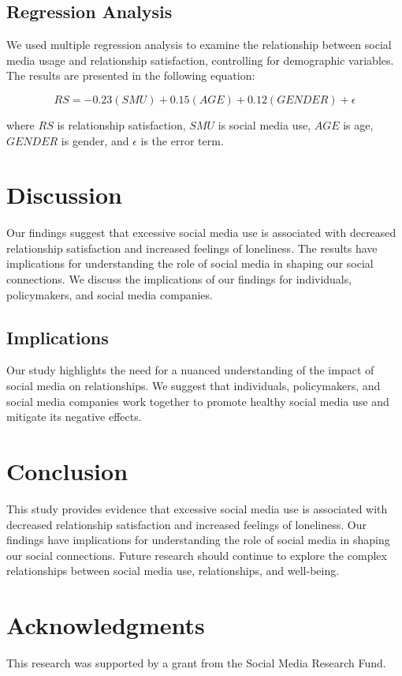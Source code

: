 \documentclass[12pt,a4paper]{article}
\begin{document}
\subsection{Regression Analysis}
We used multiple regression analysis to examine the relationship between social media usage and relationship satisfaction, controlling for demographic variables. The results are presented in the following equation:

$$RS = -0.23(SMU) + 0.15(AGE) + 0.12(GENDER) + \epsilon$$

where $RS$ is relationship satisfaction, $SMU$ is social media use, $AGE$ is age, $GENDER$ is gender, and $\epsilon$ is the error term.

\section{Discussion}
Our findings suggest that excessive social media use is associated with decreased relationship satisfaction and increased feelings of loneliness. The results have implications for understanding the role of social media in shaping our social connections. We discuss the implications of our findings for individuals, policymakers, and social media companies.

\subsection{Implications}
Our study highlights the need for a nuanced understanding of the impact of social media on relationships. We suggest that individuals, policymakers, and social media companies work together to promote healthy social media use and mitigate its negative effects.

\section{Conclusion}
This study provides evidence that excessive social media use is associated with decreased relationship satisfaction and increased feelings of loneliness. Our findings have implications for understanding the role of social media in shaping our social connections. Future research should continue to explore the complex relationships between social media use, relationships, and well-being.

\section*{Acknowledgments}
This research was supported by a grant from the Social Media Research Fund.
\end{document}
